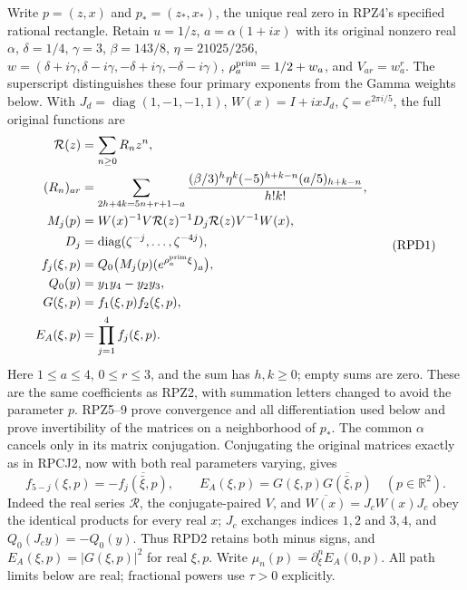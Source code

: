 \documentclass[11pt]{article}
\begin{document}
Write $p=(z,x)$ and $p_*=(z_*,x_*)$, the unique real zero in RPZ4's
specified rational rectangle.  Retain $u=1/z$,
$a=\alpha(1+ix)$ with its original nonzero real $\alpha$,
$\delta=1/4$, $\gamma=3$, $\beta=143/8$, $\eta=21025/256$,
$w=(\delta+i\gamma,\delta-i\gamma,-\delta+i\gamma,-\delta-i\gamma)$,
$\rho_a^{\rm prim}=1/2+w_a$, and $V_{ar}=w_a^r$.
The superscript distinguishes these four primary exponents from the
Gamma weights below.  With $J_d=\operatorname{diag}(1,-1,-1,1)$,
$W(x)=I+ixJ_d$, $\zeta=e^{2\pi i/5}$, the full original functions are
\[
\begin{aligned}
 \mathcal R(z)&=\sum_{n\ge0}R_nz^n,\\
 (R_n)_{ar}&=\sum_{2h+4k=5n+r+1-a}
 \frac{(\beta/3)^h\eta^k(-5)^{h+k-n}(a/5)_{h+k-n}}{h!k!},\\
 M_j(p)&=W(x)^{-1}V\mathcal R(z)^{-1}D_j\mathcal R(z)V^{-1}W(x),\\
 D_j&=\operatorname{diag}(\zeta^{-j},\ldots,\zeta^{-4j}),\\
 f_j(\xi,p)&=Q_0\bigl(M_j(p)(e^{\rho_a^{\rm prim}\xi})_a\bigr),\\
 Q_0(y)&=y_1y_4-y_2y_3,\\
 G(\xi,p)&=f_1(\xi,p)f_2(\xi,p),\\
 E_A(\xi,p)&=\prod_{j=1}^4f_j(\xi,p).
\end{aligned}\tag{RPD1}
\]
Here $1\le a\le4$, $0\le r\le3$, and the sum has $h,k\ge0$;
empty sums are zero.  These are the same coefficients as RPZ2,
with summation letters changed to avoid the parameter $p$.
RPZ5--9 prove convergence and all differentiation used below and
prove invertibility of the matrices on a neighborhood of $p_*$.
The common $\alpha$ cancels only in its matrix conjugation.
Conjugating the original matrices exactly as in RPCJ2, now with
both real parameters varying, gives
\[
 f_{5-j}(\xi,p)=-\overline{f_j(\bar\xi,p)},\qquad
 E_A(\xi,p)=G(\xi,p)\overline{G(\bar\xi,p)}
 \quad(p\in\mathbb R^2).\tag{RPD2}
\]
Indeed the real series $\mathcal R$, the conjugate-paired $V$, and
$\overline{W(x)}=J_cW(x)J_c$ obey the identical products for every
real $x$; $J_c$ exchanges indices $1,2$ and $3,4$, and
$Q_0(J_cy)=-Q_0(y)$.  Thus RPD2 retains both minus signs, and
$E_A(\xi,p)=|G(\xi,p)|^2$ for real $\xi,p$.
Write $\mu_n(p)=\partial_\xi^nE_A(0,p)$.  All path limits below
are real; fractional powers use $\tau>0$ explicitly.
\end{document}
